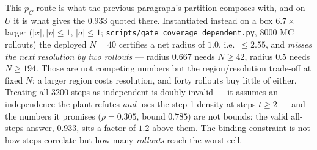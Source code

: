 \documentclass[11pt]{article}
\theoremstyle{definition}
\theoremstyle{remark}
\begin{document}
This $p_C$ route is what the previous paragraph's partition composes with, and on $U$ it is what gives the $0.933$ quoted there. Instantiated instead on a box $6.7\times$ larger ($|x|,|v| \leq 1$, $|a| \leq 1$; \texttt{scripts/\allowbreak gate\_\allowbreak coverage\_\allowbreak dependent.py}, 8000 MC rollouts) the deployed $N = 40$ certifies a net radius of $1.0$, i.e.\ $\leq 2.55$, and \emph{misses the next resolution by two rollouts} --- radius $0.667$ needs $N \geq 42$, radius $0.5$ needs $N \geq 194$. Those are not competing numbers but the region/resolution trade-off at fixed $N$: a larger region costs resolution, and forty rollouts buy little of either. Treating all $3200$ steps as independent is doubly invalid --- it assumes an independence the plant refutes \emph{and} uses the step-1 density at steps $t \geq 2$ --- and the numbers it promises ($\rho = 0.305$, bound $0.785$) are not bounds: the valid all-steps answer, $0.933$, sits a factor of $1.2$ above them. The binding constraint is not how steps correlate but how many \emph{rollouts} reach the worst cell.
\end{document}
